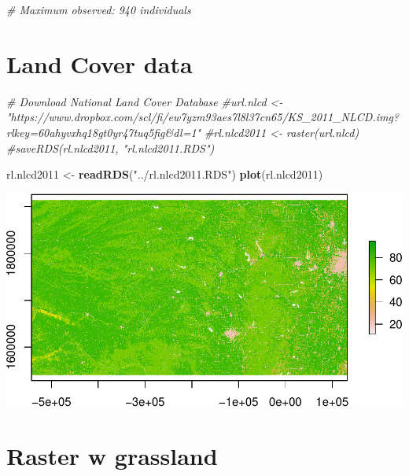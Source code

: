 \documentclass[
]{book}
\newenvironment{Shaded}{\begin{snugshade}}{\end{snugshade}}
\newcommand{\CommentTok}[1]{\textcolor[rgb]{0.56,0.35,0.01}{\textit{#1}}}
\newcommand{\FunctionTok}[1]{\textcolor[rgb]{0.13,0.29,0.53}{\textbf{#1}}}
\newcommand{\NormalTok}[1]{#1}
\newcommand{\OtherTok}[1]{\textcolor[rgb]{0.56,0.35,0.01}{#1}}
\newcommand{\StringTok}[1]{\textcolor[rgb]{0.31,0.60,0.02}{#1}}
\begin{document}
\begin{Shaded}
\begin{Highlighting}[]
\CommentTok{\# Maximum observed: 940 individuals}
\end{Highlighting}
\end{Shaded}

\hypertarget{land-cover-data}{%
\section{Land Cover data}\label{land-cover-data}}

\begin{Shaded}
\begin{Highlighting}[]
\CommentTok{\# Download National Land Cover Database}
\CommentTok{\#url.nlcd \textless{}{-} "https://www.dropbox.com/scl/fi/ew7yzm93aes7l8l37cn65/KS\_2011\_NLCD.img?rlkey=60ahyvxhq18gt0yr47tuq5fig\&dl=1"}
\CommentTok{\#rl.nlcd2011 \textless{}{-} raster(url.nlcd)}
\CommentTok{\#saveRDS(rl.nlcd2011, "rl.nlcd2011.RDS")}

\NormalTok{rl.nlcd2011 }\OtherTok{\textless{}{-}} \FunctionTok{readRDS}\NormalTok{(}\StringTok{"../rl.nlcd2011.RDS"}\NormalTok{)}
\FunctionTok{plot}\NormalTok{(rl.nlcd2011)}
\end{Highlighting}
\end{Shaded}

\includegraphics{_main_files/figure-latex/unnamed-chunk-28-1.pdf}

\hypertarget{raster-w-grassland}{%
\section{Raster w grassland}\label{raster-w-grassland}}
\end{document}

